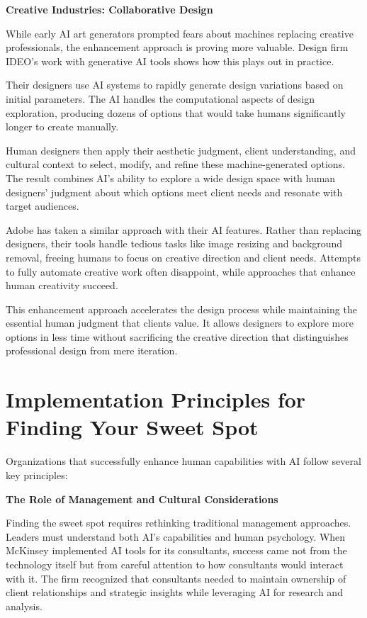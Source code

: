 \documentclass[
  Letterpaper,
]{scrbook}
\begin{document}
\textbf{Creative Industries: Collaborative
Design}

While early AI art generators prompted fears about machines replacing
creative professionals, the enhancement approach is proving more
valuable. Design firm IDEO's work with generative
AI tools shows how this plays out in
practice.

Their designers use AI systems to rapidly generate design variations
based on initial parameters. The AI
handles the computational aspects of design exploration, producing
dozens of options that would take humans significantly longer to create
manually.

Human designers then apply their aesthetic judgment, client
understanding, and cultural context to select, modify, and refine these
machine-generated options. The result combines AI's ability to explore a
wide design space with human designers' judgment about which options
meet client needs and resonate with target audiences.

Adobe has taken a similar approach with their
AI features. Rather than replacing designers, their tools handle tedious
tasks like image resizing and background removal, freeing humans to
focus on creative direction and client needs. Attempts to fully automate
creative work often disappoint, while approaches that enhance human
creativity succeed.

This enhancement approach accelerates the design process while
maintaining the essential human judgment that clients value. It allows
designers to explore more options in less time without sacrificing the
creative direction that distinguishes professional design from mere
iteration.

\section{Implementation Principles for Finding Your Sweet
Spot}\label{implementation-principles-for-finding-your-sweet-spot}

Organizations that successfully enhance human capabilities with AI
follow several key principles:

\textbf{The Role of Management and Cultural Considerations}

Finding the sweet spot requires rethinking traditional management
approaches. Leaders must understand both AI's capabilities and human
psychology. When McKinsey implemented AI tools for its consultants,
success came not from the technology itself but from careful attention
to how consultants would interact with it. The firm recognized that
consultants needed to maintain ownership of client relationships and
strategic insights while leveraging AI for research and analysis.
\end{document}
